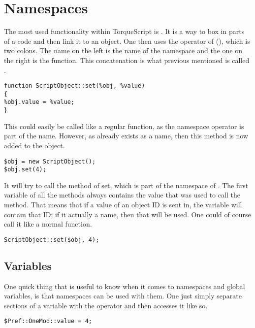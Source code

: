 \section{Namespaces}

The most used functionality within TorqueScript is . It is a way to box in parts of a code and then link it to an object. One then uses the operator of  (\code{::}), which is two colons. The name on the left is the name of the namespace and the one on the right is the function. This concatenation is what previous mentioned is called .

\begin{lstlisting}[style=ts]
function ScriptObject::set(%obj, %value)
{
%obj.value = %value;
}
\end{lstlisting}

This could easily be called like a regular function, as the namespace operator is part of the name. However, as  already exists as a name, then this method is now added to the object.

\begin{lstlisting}[style=ts]
$obj = new ScriptObject();
$obj.set(4);
\end{lstlisting}

It will try to call the method of set, which is part of the namespace of . The first variable of all the methods always contains the value that was used to call the method. That means that if a value of an object ID is sent in, the variable will contain that ID; if it actually a name, then that will be used. One could of course call it like a normal function.

\begin{lstlisting}[style=ts]
ScriptObject::set($obj, 4);
\end{lstlisting}

\subsection{Variables}

One quick thing that is useful to know when it comes to namespaces and global variables, is that namespaces can be used with them. One just simply separate sections of a variable with the operator and then accesses it like so.

\begin{lstlisting}[style=ts]
$Pref::OneMod::value = 4;
\end{lstlisting}

